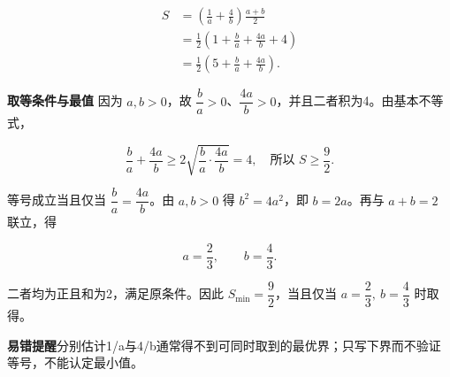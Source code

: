 \documentclass[UTF8,zihao=-4]{ctexart}
\newcommand{\labeltext}[1]{\par\textbf{#1}\quad}
\begin{document}
\[\begin{aligned}S&=\left(\frac1a+\frac4b\right)\frac{a+b}{2}\\ &=\frac12\left(1+\frac ba+\frac{4a}b+4\right)\\ &=\frac12\left(5+\frac ba+\frac{4a}b\right).\end{aligned}\]\par
\par{}
\textbf{取等条件与最值}\quad
因为 $a,b>0$，故 $\dfrac ba>0$、$\dfrac{4a}b>0$，并且二者积为4。由基本不等式，\par
\[\frac ba+\frac{4a}b\ge2\sqrt{\frac ba\cdot\frac{4a}b}=4,\quad\text{所以 }S\ge\frac92.\]\par
等号成立当且仅当 $\dfrac ba=\dfrac{4a}b$。由 $a,b>0$ 得 $b^2=4a^2$，即 $b=2a$。再与 $a+b=2$ 联立，得\par
\[a=\frac23,\qquad b=\frac43.\]\par
二者均为正且和为2，满足原条件。因此 $\boxed{S_{\min}=\dfrac92}$，当且仅当 $\boxed{a=\dfrac23,\ b=\dfrac43}$ 时取得。\par
\labeltext{易错提醒}分别估计1/a与4/b通常得不到可同时取到的最优界；只写下界而不验证等号，不能认定最小值。
\end{document}
